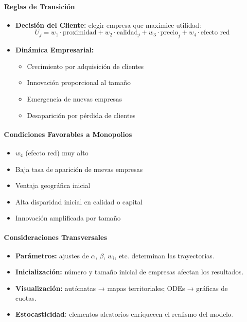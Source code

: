 \documentclass[a4paper,12pt]{article}
\begin{document}
\begin{itemize}
    \paragraph{Reglas de Transición}
    \begin{itemize}
        \item \textbf{Decisión del Cliente:} elegir empresa que maximice utilidad:
        \[
        U_j = w_1 \cdot \text{proximidad} + w_2 \cdot \text{calidad}_j + w_3 \cdot \text{precio}_j + w_4 \cdot \text{efecto red}
        \]
        \item \textbf{Dinámica Empresarial:}
        \begin{itemize}
            \item Crecimiento por adquisición de clientes
            \item Innovación proporcional al tamaño
            \item Emergencia de nuevas empresas
            \item Desaparición por pérdida de clientes
        \end{itemize}
    \end{itemize}

    \paragraph{Condiciones Favorables a Monopolios}
    \begin{itemize}
        \item $w_4$ (efecto red) muy alto
        \item Baja tasa de aparición de nuevas empresas
        \item Ventaja geográfica inicial
        \item Alta disparidad inicial en calidad o capital
        \item Innovación amplificada por tamaño
    \end{itemize}
\end{itemize}

\paragraph{Consideraciones Transversales}
\begin{itemize}
    \item \textbf{Parámetros:} ajustes de $\alpha$, $\beta$, $w_i$, etc. determinan las trayectorias.
    \item \textbf{Inicialización:} número y tamaño inicial de empresas afectan los resultados.
    \item \textbf{Visualización:} autómatas → mapas territoriales; ODEs → gráficas de cuotas.
    \item \textbf{Estocasticidad:} elementos aleatorios enriquecen el realismo del modelo.
\end{itemize}
\end{document}
